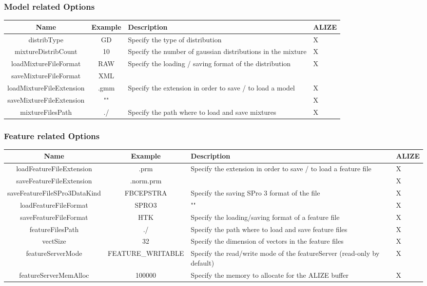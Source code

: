 \documentclass[a4paper]{article}
\begin{document}
\subsubsection{Model related Options}
\begin{tabular}{|c|c||p{8cm}|p{0.8cm}|}
\hline Name & Example & Description & ALIZE\\
\hline
\hline distribType & GD & Specify the type of distribution & X\\
\hline mixtureDistribCount & 10 & Specify the number of gaussian distributions in the mixture & X\\
\hline loadMixtureFileFormat & RAW & Specify the loading / saving format of the distribution & X\\
\cline{1-2} saveMixtureFileFormat & XML & &\\
\hline loadMixtureFileExtension & .gmm & Specify the extension in order to save / to load a model & X\\
\cline{1-2}  saveMixtureFileExtension   & "" &  & X\\
\hline mixtureFilesPath & ./ & Specify the path where to load and save mixtures & X\\
\hline
\end{tabular}

\subsubsection{Feature related Options}
\begin{tabular}{|c|c||p{8cm}|p{0.8cm}|}
\hline Name & Example & Description & ALIZE\\
\hline
\hline loadFeatureFileExtension & .prm & Specify the extension in order to save / to load a feature file & X\\
\cline{1-2}  saveFeatureFileExtension & .norm.prm &  & X\\
\hline saveFeatureFileSPro3DataKind & FBCEPSTRA & Specify the saving SPro 3 format of the file & X\\
\hline loadFeatureFileFormat & SPRO3 & "" & X\\
\hline saveFeatureFileFormat & HTK & Specify the loading/saving format of a feature file & X\\
\hline featureFilesPath & ./ & Specify the path where to load and save feature files & X\\
\hline vectSize & 32 & Specify the dimension of vectors in the feature files & X\\
\hline featureServerMode & FEATURE\_WRITABLE & Specify the read/write mode of the featureServer (read-only by default) & X\\
\hline featureServerMemAlloc & 100000 & Specify the memory to allocate for the ALIZE buffer & X\\
\hline
\end{tabular}
\end{document}

